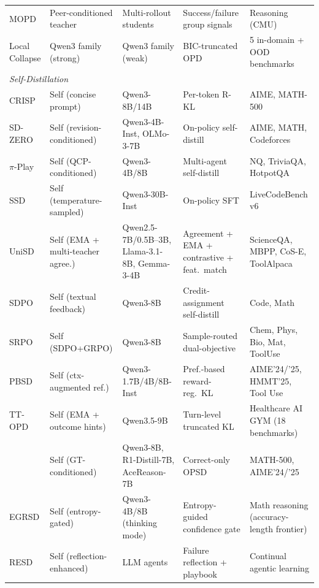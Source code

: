 \documentclass{article} %
\begin{document}
\begin{table}[t]
{\begin{tabular}{@{}lllll@{}}
        MOPD \citep{2605.12652} & Peer-conditioned teacher & Multi-rollout students & Success/failure group signals & Reasoning (CMU) \\
        Local Collapse \citep{2605.13643} & Qwen3 family (strong) & Qwen3 family (weak) & BIC-truncated OPD & 5 in-domain + OOD benchmarks \\
        \midrule
        \multicolumn{5}{l}{\textit{Self-Distillation}} \\
        \midrule
        CRISP \citep{2603.05433} & Self (concise prompt) & Qwen3-8B/14B & Per-token R-KL & AIME, MATH-500 \\
        SD-ZERO \citep{2604.12002} & Self (revision-conditioned) & Qwen3-4B-Inst, OLMo-3-7B & On-policy self-distill & AIME, MATH, Codeforces \\
        $\pi$-Play \citep{2604.14054} & Self (QCP-conditioned) & Qwen3-4B/8B & Multi-agent self-distill & NQ, TriviaQA, HotpotQA \\
        SSD \citep{2604.01193} & Self (temperature-sampled) & Qwen3-30B-Inst & On-policy SFT & LiveCodeBench v6 \\
        UniSD \citep{2605.06597} & Self (EMA + multi-teacher agree.) & Qwen2.5-7B/0.5B--3B, Llama-3.1-8B, Gemma-3-4B & Agreement + EMA + contrastive + feat.~match & ScienceQA, MBPP, CoS-E, ToolAlpaca \\
        SDPO \citep{2601.20802} & Self (textual feedback) & Qwen3-8B & Credit-assignment self-distill & Code, Math \\
        SRPO \citep{2604.02288} & Self (SDPO+GRPO) & Qwen3-8B & Sample-routed dual-objective & Chem, Phys, Bio, Mat, ToolUse \\
        PBSD \citep{2605.05040} & Self (ctx-augmented ref.) & Qwen3-1.7B/4B/8B-Inst & Pref.-based reward-reg.\ KL & AIME'24/'25, HMMT'25, Tool Use \\
        TT-OPD \citep{2605.02943} & Self (EMA + outcome hints) & Qwen3.5-9B & Turn-level truncated KL & Healthcare AI GYM (18 benchmarks) \\
        \citet{2605.06188} & Self (GT-conditioned) & Qwen3-8B, R1-Distill-7B, AceReason-7B & Correct-only OPSD & MATH-500, AIME'24/'25 \\
        EGRSD \citep{2605.13255} & Self (entropy-gated) & Qwen3-4B/8B (thinking mode) & Entropy-guided confidence gate & Math reasoning (accuracy-length frontier) \\
        RESD \citep{2605.12741} & Self (reflection-enhanced) & LLM agents & Failure reflection + playbook & Continual agentic learning \\

\end{tabular}}
\end{table}
\end{document}
